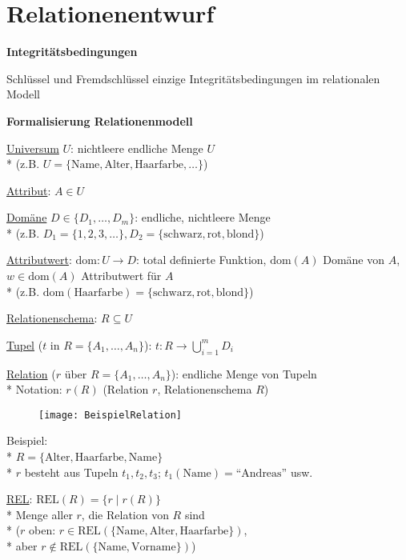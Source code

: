 \section{Relationenentwurf}
\label{sec:relationenentwurf}

\textbf{Integritätsbedingungen}
\begin{items}
	\item Schlüssel und Fremdschlüssel einzige Integritätsbedingungen im relationalen Modell
\end{items}

\textbf{Formalisierung Relationenmodell}
\begin{items}
	\item \underline{Universum} \( U \): nichtleere endliche Menge \( U \)\\* (z.B. \( U= \{ \text{Name}, \text{Alter}, \text{Haarfarbe}, \dots \} \))
	\item \underline{Attribut}: \( A \in U \)
	\item \underline{Domäne} \( D \in \{ D_1, \dots, D_m \} \): endliche, nichtleere Menge \\* (z.B. \( D_1 = \{ 1,2,3,\dots \}, D_2 = \{ \text{schwarz}, \text{rot}, \text{blond} \} \))
	\item \underline{Attributwert}: \( \text{dom}: U \to D \): total definierte Funktion, \( \text{dom}(A) \) Domäne von \( A \), \( w \in \text{dom}(A) \) Attributwert für \( A \) \\* (z.B. \( \text{dom}(\text{Haarfarbe}) = \{ \text{schwarz}, \text{rot}, \text{blond} \} \))
	\item \underline{Relationenschema}: \( R \subseteq U \)
	\item \underline{Tupel} (\( t \) in \( R = \{ A_1, \dots, A_n \} \)): \( t: R \to \bigcup_{i=1}^m D_i \)
	\item \underline{Relation} (\( r \) über \( R = \{ A_1, \dots, A_n \} \)): endliche Menge von Tupeln \\* Notation: \( r(R) \) (Relation \( r \), Relationenschema \( R \))
	\begin{figure}[H]\centering\label{BeispielRelation}\texttt{[image: BeispielRelation]}\end{figure}
	\item Beispiel: \\* \( R = \{ \text{Alter}, \text{Haarfarbe}, \text{Name} \} \) \\* \( r \) besteht aus Tupeln \( t_1, t_2, t_3 \); \( t_1(\text{Name}) = \text{``Andreas''} \) usw.
	\item \underline{REL}: \( \text{REL}(R) = \{ r \mid r(R) \} \) \\* Menge aller \( r \), die Relation von \( R \) sind \\* (\( r \) oben: \( r \in \text{REL}(\{ \text{Name}, \text{Alter}, \text{Haarfarbe} \}) \), \\* aber \( r \not \in \text{REL}(\{ \text{Name}, \text{Vorname} \}) \))

\end{items}
